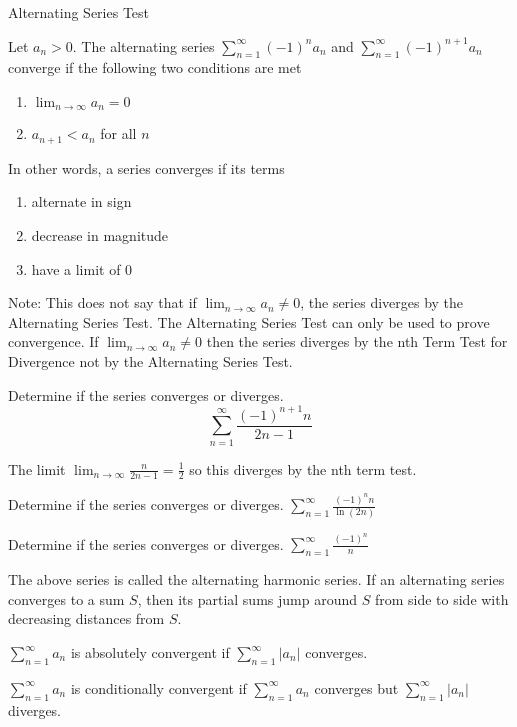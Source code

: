 \documentclass[../bccalc.tex]{subfiles}
\begin{document}
Alternating Series Test 

Let $a_n>0$. The alternating series $\sum_{n=1}^{\infty}(-1)^n a_n$ and $\sum_{n=1}^{\infty}(-1)^{n+1}a_n$ converge if the following two conditions are met 
\begin{enumerate}
    \item $\lim_{n\to\infty}a_n=0$
    \item $a_{n+1}<a_n$ for all $n$
\end{enumerate}
In other words, a series converges if its terms 
\begin{enumerate}
    \item alternate in sign 
    \item decrease in magnitude 
    \item have a limit of 0
\end{enumerate}

Note: This does not say that if $\lim_{n\to\infty}a_n\neq 0$, the series diverges by the Alternating Series Test. The Alternating Series Test can only be used to prove convergence. If $\lim_{n\to\infty}a_n\neq 0$ then the series diverges by the nth Term Test for Divergence not by the Alternating Series Test.
\pagebreak
\begin{example}
    Determine if the series converges or diverges.
    \[ \sum_{n=1}^{\infty}\frac{(-1)^{n+1}n}{2n-1} \]

    The limit $\lim_{n\to\infty}\frac{n}{2n-1}=\frac{1}{2}$ so this diverges by the nth term test.
\end{example}

\ex Determine if the series converges or diverges. $\sum_{n=1}^{\infty}\frac{(-1)^n n}{\ln(2n)}$

\ex Determine if the series converges or diverges. $\sum_{n=1}^{\infty}\frac{(-1)^n}{n}$

The above series is called the alternating harmonic series. If an alternating series converges to a sum $S$, then its partial sums jump around $S$ from side to side with decreasing distances from $S$. 

\begin{definition}
    $\sum_{n=1}^{\infty}a_n$ is absolutely convergent if $\sum_{n=1}^{\infty}|a_n|$ converges.

    $\sum_{n=1}^{\infty}a_n$ is conditionally convergent if $\sum_{n=1}^{\infty}a_n$ converges but $\sum_{n=1}^{\infty}|a_n|$ diverges.
\end{definition}
\end{document}
